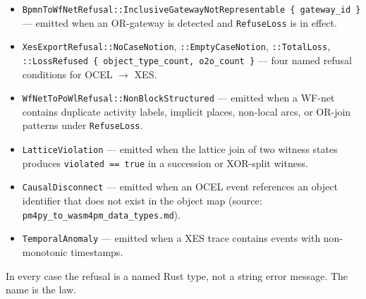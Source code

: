 \begin{itemize}
  \item \texttt{BpmnToWfNetRefusal::InclusiveGatewayNotRepresentable \{ gateway\_id \}} ---
        emitted when an \textsc{OR}-gateway is detected and \texttt{RefuseLoss} is in effect.
  \item \texttt{XesExportRefusal::NoCaseNotion}, \texttt{::EmptyCaseNotion}, \texttt{::TotalLoss},
        \texttt{::LossRefused \{ object\_type\_count, o2o\_count \}} --- four named refusal
        conditions for \textsc{OCEL} $\to$ \textsc{XES}.
  \item \texttt{WfNetToPoWlRefusal::NonBlockStructured} --- emitted when a WF-net contains
        duplicate activity labels, implicit places, non-local arcs, or \textsc{OR}-join patterns
        under \texttt{RefuseLoss}.
  \item \texttt{LatticeViolation} --- emitted when the lattice join of two witness states
        produces \texttt{violated == true} in a succession or XOR-split witness.
  \item \texttt{CausalDisconnect} --- emitted when an \textsc{OCEL} event references an object
        identifier that does not exist in the object map (source:
        \texttt{pm4py\_to\_wasm4pm\_data\_types.md}).
  \item \texttt{TemporalAnomaly} --- emitted when a \textsc{XES} trace contains events with
        non-monotonic timestamps.
\end{itemize}

In every case the refusal is a named Rust type, not a string error message. The name is the law.
